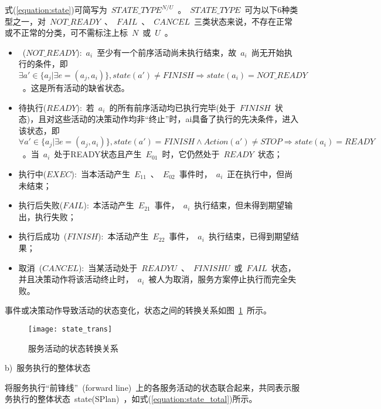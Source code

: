 式(\ref{equation:state})可简写为~$STATE\_TYPE^{N/U}$~。~$STATE\_TYPE$~可为以下6种类型之一，对~$NOT\_READY$~、~$FAIL$~、~$CANCEL$~三类状态来说，不存在正常或不正常的分类，可不需标注上标~$N$~或~$U$~。

\begin{itemize}
    
    \item ~($NOT\_READY$):~$a_i$~至少有一个前序活动尚未执行结束，故~$a_i$~尚无开始执行的条件，即~$\exists a' \in \{ {a_j}|\exists e = ( {{a_j},{a_i}} )\} ,state ( {a'} ) \ne FINISH \Rightarrow state ( {{a_i}} ) = NOT\_READY$~。这是所有活动的缺省状态。
    
    \item 待执行($READY$):~若~$a_i$~的所有前序活动均已执行完毕(处于~$FINISH$~状态)，且对这些活动的决策动作均非“终止”时，ai具备了执行的先决条件，进入该状态，即~$\forall a' \in \{ {a_j}|\exists e = ( {{a_j},{a_i}} )\} ,state ( {a'} ) = FINISH \wedge Action(a') \ne STOP \Rightarrow state ( {{a_i}} ) = READY$~。当~$a_i$~处于READY状态且产生~$E_{01}$~时，它仍然处于~$READY$~状态；
    
    \item 执行中($EXEC$):~当本活动产生~$E_{11}$~、~$E_{02}$~事件时，~$a_i$~正在执行中，但尚未结束；
    
    \item 执行后失败($FAIL$):~本活动产生~$E_{21}$~事件，~$a_i$~执行结束，但未得到期望输出，执行失败；
    
    \item 执行后成功~($FINISH$):~本活动产生~$E_{22}$~事件，~$a_i$~执行结束，已得到期望结果；
    
    \item 取消~($CANCEL$):~当某活动处于~$READYU$~、~$FINISHU$~或~$FAIL$~状态，并且决策动作将该活动终止时，~$a_i$~被人为取消，服务方案停止执行而完全失败。
\end{itemize}

事件或决策动作导致活动的状态变化，状态之间的转换关系如图~\ref{figure:state_trans}~所示。
\begin{figure}[htbp]
    \centering
    \texttt{[image: state\_trans]}
    \caption{服务活动的状态转换关系}\label{figure:state_trans}
    \vspace{-1em}
\end{figure}

b)~服务执行的整体状态

将服务执行“前锋线”~(forward line)~上的各服务活动的状态联合起来，共同表示服务执行的整体状态~state(SPlan)~，如式(\ref{equation:state_total})所示。

